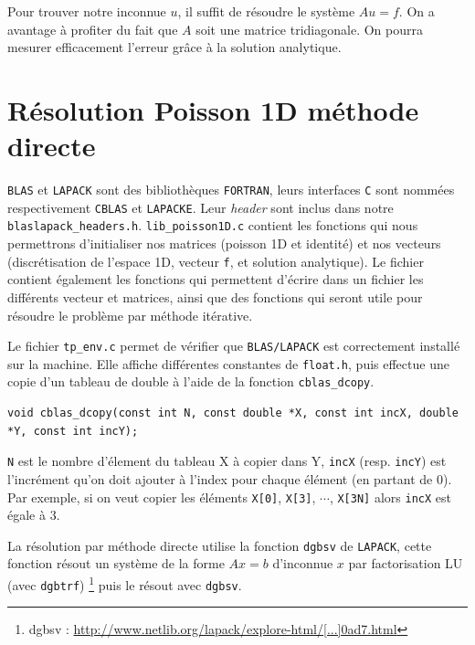 \documentclass{article}
\begin{document}
Pour trouver notre inconnue $u$, il suffit de résoudre le système \(Au = f\). On a avantage à profiter du fait que $A$ soit une matrice tridiagonale. On pourra mesurer efficacement l'erreur grâce à la solution analytique.

\section{Résolution Poisson 1D méthode directe}

\texttt{BLAS} et \texttt{LAPACK} sont des bibliothèques \texttt{FORTRAN}, leurs interfaces \texttt{C} sont nommées respectivement \texttt{CBLAS} et \texttt{LAPACKE}. Leur \textit{header} sont inclus dans notre \texttt{blaslapack\_headers.h}. \texttt{lib\_poisson1D.c} contient les fonctions qui nous permettrons d'initialiser nos matrices (poisson 1D et identité) et nos vecteurs (discrétisation de l'espace 1D, vecteur \texttt{f}, et solution analytique). Le fichier contient également les fonctions qui permettent d'écrire dans un fichier les différents vecteur et matrices, ainsi que des fonctions qui seront utile pour résoudre le problème par méthode itérative.

Le fichier \texttt{tp\_env.c} permet de vérifier que \texttt{BLAS/LAPACK} est correctement installé sur la machine. Elle affiche différentes constantes de \texttt{float.h}, puis effectue une copie d'un tableau de double à l'aide de la fonction \texttt{cblas\_dcopy}.

\begin{scriptsize}
\begin{verbatim}
void cblas_dcopy(const int N, const double *X, const int incX, double *Y, const int incY);
\end{verbatim}
\end{scriptsize}
\texttt{N} est le nombre d'élement du tableau X à copier dans Y, \texttt{incX} (resp. \texttt{incY}) est l'incrément qu'on doit ajouter à l'index pour chaque élément (en partant de 0). Par exemple, si on veut copier les éléments \texttt{X[0]}, \texttt{X[3]}, $\cdots$, \texttt{X[3N]} alors \texttt{incX} est égale à $3$.

La résolution par méthode directe utilise la fonction \texttt{dgbsv} de \texttt{LAPACK}, cette fonction résout un système de la forme $Ax = b$ d'inconnue $x$ par factorisation LU (avec \texttt{dgbtrf}) \footnote{dgbsv : \href{http://www.netlib.org/lapack/explore-html/d3/d49/group__double_g_bsolve_gafa35ce1d7865b80563bbed6317050ad7.html}{http://www.netlib.org/lapack/explore-html/[...]0ad7.html}} puis le résout avec \texttt{dgbsv}.
\end{document}
